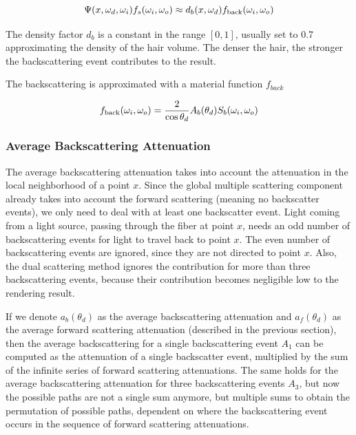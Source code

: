\begin{equation}
\Psi(x, \omega_d, \omega_i) f_s(\omega_i, \omega_o) \approx d_b(x, \omega_d) f_{\textnormal{back}}(\omega_i, \omega_o)
\end{equation}

The density factor $d_b$ is a constant in the range $[0, 1]$, usually set to 0.7 approximating the density of the hair volume. The denser the hair, the stronger the backscattering event contributes to the result.

The backscattering is approximated with a material function $f_{back}$

\begin{equation}
f_{\textnormal{back}}(\omega_i, \omega_o) = \frac{2}{\cos \theta_d}A_b(\theta_d) S_b(\omega_i, \omega_o)
\end{equation}

\subsubsection{Average Backscattering Attenuation}

The average backscattering attenuation takes into account the attenuation in the local neighborhood of a point $x$. Since the global multiple scattering component already takes into account the forward scattering (meaning no backscatter events), we only need to deal with at least one backscatter event. Light coming from a light source, passing through the fiber at point $x$, needs an odd number of backscattering events for light to travel back to point $x$. The even number of backscattering events are ignored, since they are not directed to point $x$. Also, the dual scattering method ignores the contribution for more than three backscattering events, because their contribution becomes negligible low to the rendering result. 

If we denote $a_b(\theta_d)$ as the average backscattering attenuation and $a_f(\theta_d)$ as the average forward scattering attenuation (described in the previous section), then the average backscattering for a single backscattering event $A_1$ can be computed as the attenuation of a single backscatter event, multiplied by the sum of the infinite series of forward scattering attenuations. The same holds for the average backscattering attenuation for three backscattering events $A_3$, but now the possible paths are not a single sum anymore, but multiple sums to obtain the permutation of possible paths, dependent on where the backscattering event occurs in the sequence of forward scattering attenuations.

